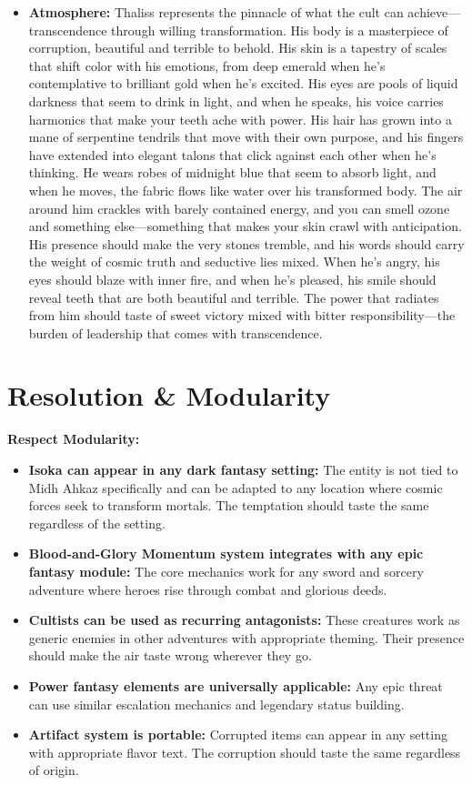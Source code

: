 \documentclass[11pt]{article}
\begin{document}
\begin{itemize}
\begin{itemize}
\begin{itemize}
  \item \textbf{Atmosphere:} Thaliss represents the pinnacle of what the cult can achieve—transcendence through willing transformation. His body is a masterpiece of corruption, beautiful and terrible to behold. His skin is a tapestry of scales that shift color with his emotions, from deep emerald when he's contemplative to brilliant gold when he's excited. His eyes are pools of liquid darkness that seem to drink in light, and when he speaks, his voice carries harmonics that make your teeth ache with power. His hair has grown into a mane of serpentine tendrils that move with their own purpose, and his fingers have extended into elegant talons that click against each other when he's thinking. He wears robes of midnight blue that seem to absorb light, and when he moves, the fabric flows like water over his transformed body. The air around him crackles with barely contained energy, and you can smell ozone and something else—something that makes your skin crawl with anticipation. His presence should make the very stones tremble, and his words should carry the weight of cosmic truth and seductive lies mixed. When he's angry, his eyes should blaze with inner fire, and when he's pleased, his smile should reveal teeth that are both beautiful and terrible. The power that radiates from him should taste of sweet victory mixed with bitter responsibility—the burden of leadership that comes with transcendence.
  \end{itemize}
\end{itemize}

\section{Resolution \& Modularity}

\textbf{Respect Modularity:}
\begin{itemize}
\item \textbf{Isoka can appear in any dark fantasy setting:} The entity is not tied to Midh Ahkaz specifically and can be adapted to any location where cosmic forces seek to transform mortals. The temptation should taste the same regardless of the setting.
\item \textbf{Blood-and-Glory Momentum system integrates with any epic fantasy module:} The core mechanics work for any sword and sorcery adventure where heroes rise through combat and glorious deeds.
\item \textbf{Cultists can be used as recurring antagonists:} These creatures work as generic enemies in other adventures with appropriate theming. Their presence should make the air taste wrong wherever they go.
\item \textbf{Power fantasy elements are universally applicable:} Any epic threat can use similar escalation mechanics and legendary status building.
\item \textbf{Artifact system is portable:} Corrupted items can appear in any setting with appropriate flavor text. The corruption should taste the same regardless of origin.
\end{itemize}


\end{itemize}
\end{document}
